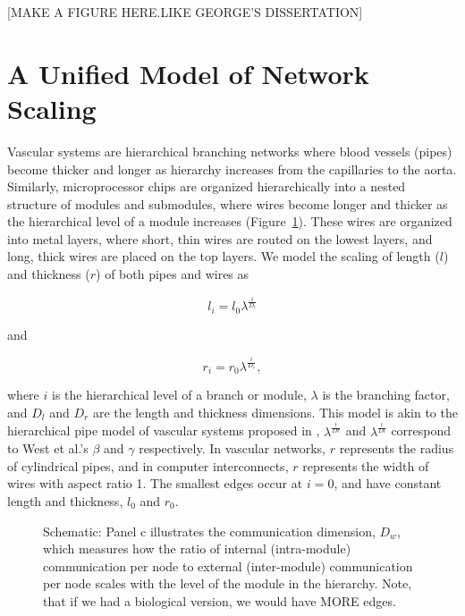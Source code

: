\documentclass[12pt]{article}
\begin{document}
[MAKE A FIGURE HERE.LIKE GEORGE'S DISSERTATION]

\section{A Unified Model of Network Scaling}
\label{sec:unified-model}


Vascular systems are hierarchical branching networks where blood vessels
(pipes) become thicker and longer as hierarchy increases from the capillaries
to the aorta. Similarly, microprocessor chips are organized hierarchically into
a nested structure of modules and submodules, where wires become longer and
thicker as the hierarchical level of a module increases
(Figure~\ref{fig:model-schematic}).  These wires are organized into metal
layers, where short, thin wires are routed on the lowest layers, and long,
thick wires are placed on the top layers. We model the scaling of length ($l$)
and thickness ($r$) of both pipes and wires as

\begin{equation}
l_i = l_0 \lambda^{\frac{i}{D_l}}
\end{equation}

\noindent and

\begin{equation}
  r_i = r_0 \lambda^{\frac{i}{D_r}},
\label{eq:rscaling}
\end{equation}

\noindent where $i$ is the hierarchical level of a branch or module, $\lambda$
is the branching factor, and $D_l$ and $D_r$ are the length and thickness
dimensions. This model is akin to the hierarchical pipe model of vascular
systems proposed in \cite{west97}, $\lambda^{\frac{i}{Dr}}$ and
$\lambda^{\frac{i}{Dl}}$ correspond to West et al.'s $\beta$ and $\gamma$
respectively.
In vascular networks, $r$ represents the radius of cylindrical pipes, and in
computer interconnects, $r$ represents the width of wires with aspect ratio 1.
The smallest edges occur at $i = 0$, and have constant length and thickness,
$l_0$ and $r_0$. 

\begin{figure}
\caption{Schematic: Panel c illustrates the communication dimension, $D_w$,
  which measures how the ratio of internal (intra-module) communication per node to
  external (inter-module) communication per node scales with the level of the module in
  the hierarchy. Note, that if we had a biological version, we would
  have MORE edges.}
  \label{fig:model-schematic}
\end{figure}
\end{document}
